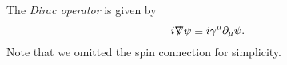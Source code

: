 \documentclass[a4paper,pdftex,10pt]{report}
\begin{document}
The \textit{Dirac operator} is given by
\begin{equation}
  i\slashed{\nabla}\psi
  \equiv
  i\gamma^{\mu}\partial_{\mu}\psi
  .
\end{equation}
Note that we omitted the spin connection for simplicity. 








\clearpage



\nocite{Peskin:1995}
\nocite{Nair:2005}
\nocite{Weinberg:1996kr}
\nocite{Weinberg:1995mt}
\nocite{Weinberg:2000}

\nocite{Witten:1982df}
\nocite{Witten:1982im}

\nocite{Seiberg:1994aj}
\nocite{Seiberg:1994rs}
\nocite{Alvarez-Gaume:1996ohl}
\nocite{Tachikawa:2013kta}

\end{document}
